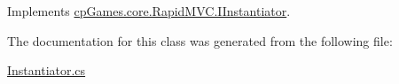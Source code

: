 Implements \mbox{\hyperlink{interfacecp_games_1_1core_1_1_rapid_m_v_c_1_1_i_instantiator_a371da21e60164cf08f32fb39fb184584}{cp\+Games.\+core.\+Rapid\+M\+V\+C.\+I\+Instantiator}}.



The documentation for this class was generated from the following file\+:\begin{DoxyCompactItemize}
\item 
\mbox{\hyperlink{_instantiator_8cs}{Instantiator.\+cs}}\end{DoxyCompactItemize}
